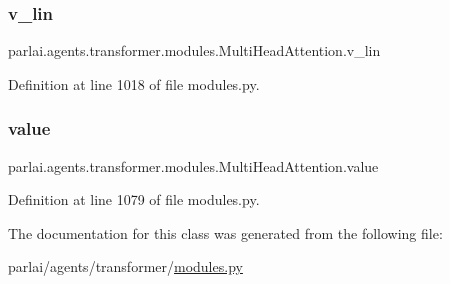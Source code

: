 \subsubsection{\texorpdfstring{v\+\_\+lin}{v\_lin}}
{\footnotesize\ttfamily parlai.\+agents.\+transformer.\+modules.\+Multi\+Head\+Attention.\+v\+\_\+lin}



Definition at line 1018 of file modules.\+py.

\mbox{\label{classparlai_1_1agents_1_1transformer_1_1modules_1_1MultiHeadAttention_a16e1973304e7a76af3293daa82e2f17a}} 
\subsubsection{\texorpdfstring{value}{value}}
{\footnotesize\ttfamily parlai.\+agents.\+transformer.\+modules.\+Multi\+Head\+Attention.\+value\hspace{0.3cm}{\ttfamily [static]}}



Definition at line 1079 of file modules.\+py.



The documentation for this class was generated from the following file\+:\begin{DoxyCompactItemize}
\item 
parlai/agents/transformer/\hyperlink{parlai_2agents_2transformer_2modules_8py}{modules.\+py}\end{DoxyCompactItemize}
